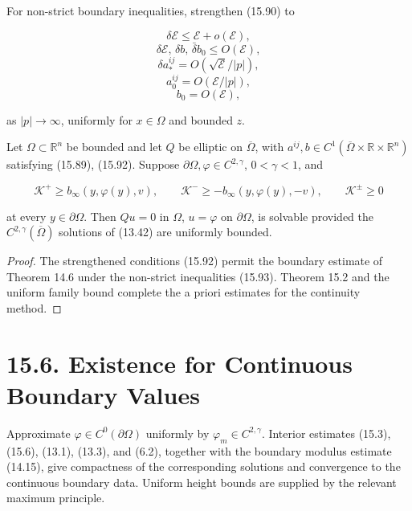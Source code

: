 \medskip

For non-strict boundary inequalities, strengthen (15.90) to

\[
\delta\mathcal{E}\le \mathcal{E}+o(\mathcal{E}),
\]
\[
\delta\mathcal{E},\,\delta b,\,\bar{\delta}b_0\le O(\mathcal{E}),
\]
\[
\tag{15.92}
\delta a_*^{ij}=O\!\left(\sqrt{\mathcal{E}}/|p|\right),
\]
\[
a_0^{ij}=O(\mathcal{E}/|p|),
\]
\[
b_0=O(\mathcal{E}),
\]

\noindent as \(|p|\to\infty\), uniformly for \(x\in\Omega\) and bounded \(z\).

\medskip

\begin{theorem}\label{gilbarg-trudinger.thm.15.17.nonstrict-boundary-curvature}
Let \(\Omega\subset\mathbb R^n\) be bounded and let \(Q\) be elliptic on
\(\overline\Omega\), with
\(a^{ij},b\in C^1(\overline\Omega\times\mathbb R\times\mathbb R^n)\) satisfying
(15.89), (15.92). Suppose \(\partial\Omega,\varphi\in C^{2,\gamma}\),
\(0<\gamma<1\), and

\[
\tag{15.93}
\mathcal{K}^{+}\ge b_\infty(y,\varphi(y),v), \qquad \mathcal{K}^{-}\ge -b_\infty(y,\varphi(y),-v), \qquad \mathcal{K}^{\pm}\ge 0
\]

at every \(y\in\partial\Omega\). Then \(Qu=0\) in \(\Omega\),
\(u=\varphi\) on \(\partial\Omega\), is solvable provided the
\(C^{2,\gamma}(\overline\Omega)\) solutions of (13.42) are uniformly bounded.
\end{theorem}
\begin{proof}
\sketch The strengthened conditions (15.92) permit the boundary estimate of
Theorem 14.6 under the non-strict inequalities (15.93). Theorem 15.2 and the
uniform family bound complete the a priori estimates for the continuity method.
\end{proof}

\bigskip

\section*{15.6. Existence for Continuous Boundary Values}

\medskip

Approximate \(\varphi\in C^0(\partial\Omega)\) uniformly by
\(\varphi_m\in C^{2,\gamma}\). Interior estimates (15.3), (15.6), (13.1),
(13.3), and (6.2), together with the boundary modulus estimate (14.15), give
compactness of the corresponding solutions and convergence to the continuous
boundary data. Uniform height bounds are supplied by the relevant maximum
principle.

